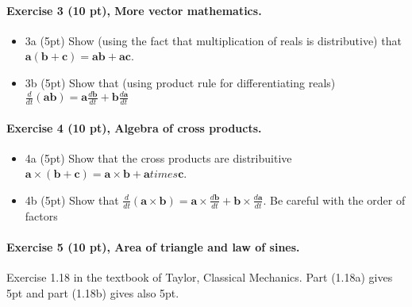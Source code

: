 \documentclass[%
oneside,                 %
final,                   %
10pt]{article}
\begin{document}
\noindent
\paragraph{Exercise 3 (10 pt), More vector mathematics.}
\begin{itemize}
\item 3a (5pt) Show (using the fact that multiplication of reals is distributive) that $\bm{a}(\bm{b}+\bm{c})=\bm{a}\bm{b}+\bm{a}\bm{c}$.

\item 3b (5pt) Show that (using product rule for differentiating reals)  $\frac{d}{dt}(\bm{a}\bm{b})=\bm{a}\frac{d\bm{b}}{dt}+\bm{b}\frac{d\bm{a}}{dt}$
\end{itemize}

\noindent
\paragraph{Exercise 4 (10 pt), Algebra of cross products.}
\begin{itemize}
\item 4a (5pt) Show that the cross products are distribuitive $\bm{a}\times(\bm{b}+\bm{c})=\bm{a}\times\bm{b}+\bm{a}times\bm{c}$.

\item 4b (5pt) Show that $\frac{d}{dt}(\bm{a}\times\bm{b})=\bm{a}\times\frac{d\bm{b}}{dt}+\bm{b}\times\frac{d\bm{a}}{dt}$. Be careful with the order of factors 
\end{itemize}

\noindent
\paragraph{Exercise 5 (10 pt), Area of triangle and law of sines.}
Exercise 1.18 in the textbook of Taylor, Classical Mechanics. Part (1.18a) gives 5pt and part (1.18b) gives also 5pt.
\end{document}
